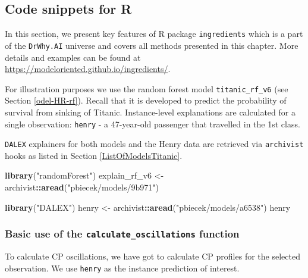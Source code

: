 \documentclass[12pt,]{krantz}
\newenvironment{Shaded}{\begin{snugshade}}{\end{snugshade}}
\newcommand{\KeywordTok}[1]{\textcolor[rgb]{0.13,0.29,0.53}{\textbf{#1}}}
\newcommand{\NormalTok}[1]{#1}
\newcommand{\OperatorTok}[1]{\textcolor[rgb]{0.81,0.36,0.00}{\textbf{#1}}}
\newcommand{\StringTok}[1]{\textcolor[rgb]{0.31,0.60,0.02}{#1}}
\theoremstyle{definition}
\theoremstyle{definition}
\theoremstyle{definition}
\theoremstyle{remark}
\begin{document}
\hypertarget{CPOscR}{%
\subsection{Code snippets for R}\label{CPOscR}}

In this section, we present key features of R package
\texttt{ingredients} which is a part of the \texttt{DrWhy.AI} universe
and covers all methods presented in this chapter. More details and
examples can be found at
\url{https://modeloriented.github.io/ingredients/}.

For illustration purposes we use the random forest model
\texttt{titanic\_rf\_v6} (see Section \ref{odel-HR-rf}). Recall that it
is developed to predict the probability of survival from sinking of
Titanic. Instance-level explanations are calculated for a single
observation: \texttt{henry} - a 47-year-old passenger that travelled in
the 1st class.

\texttt{DALEX} explainers for both models and the Henry data are
retrieved via \texttt{archivist} hooks as listed in Section
\ref{ListOfModelsTitanic}.

\begin{Shaded}
\begin{Highlighting}[]
\KeywordTok{library}\NormalTok{(}\StringTok{"randomForest"}\NormalTok{)}
\NormalTok{explain_rf_v6 <-}\StringTok{ }\NormalTok{archivist}\OperatorTok{::}\KeywordTok{aread}\NormalTok{(}\StringTok{"pbiecek/models/9b971"}\NormalTok{)}

\KeywordTok{library}\NormalTok{(}\StringTok{"DALEX"}\NormalTok{)}
\NormalTok{henry <-}\StringTok{ }\NormalTok{archivist}\OperatorTok{::}\KeywordTok{aread}\NormalTok{(}\StringTok{"pbiecek/models/a6538"}\NormalTok{)}
\NormalTok{henry}
\end{Highlighting}
\end{Shaded}

\hypertarget{basic-use-of-the-calculate_oscillations-function}{%
\subsubsection{\texorpdfstring{Basic use of the
\texttt{calculate\_oscillations}
function}{Basic use of the calculate\_oscillations function}}\label{basic-use-of-the-calculate_oscillations-function}}

To calculate CP oscillations, we have got to calculate CP profiles for
the selected observation. We use \texttt{henry} as the instance
prediction of interest.
\end{document}
